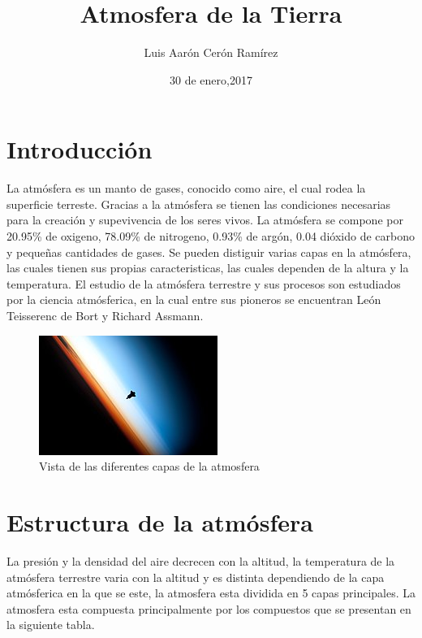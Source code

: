 \documentclass{article}
\title{Atmosfera de la Tierra}
\author{Luis Aarón Cerón Ramírez}
\date{30 de enero,2017}
\begin{document}
\maketitle
\section{Introducción}
La atmósfera es un manto de gases, conocido como aire, el cual rodea la superficie terreste. Gracias a la atmósfera se tienen las condiciones necesarias para la creación y supevivencia de los seres vivos.
\newline
La atmósfera se compone por 20.95\% de oxigeno, 78.09\% de nitrogeno, 0.93\% de argón, 0.04 dióxido de carbono y pequeñas cantidades de gases.
\newline
Se pueden distiguir varias capas en la atmósfera, las cuales tienen sus propias caracteristicas, las cuales dependen de la altura y la temperatura.
\newline
El estudio de la atmósfera terrestre y sus procesos son estudiados por la ciencia atmósferica, en la cual entre sus pioneros se encuentran León Teisserenc de Bort y Richard Assmann.

\begin{figure}
  \centering
  \includegraphics[scale=0.7]{at.jpg}
  \caption{Vista de las diferentes capas de la atmosfera }
  \label{fig:capas atmosferica}
\end{figure}

\section{Estructura de la atmósfera}
La presión y la densidad del aire decrecen con la altitud, la temperatura de la atmósfera terrestre varia con la altitud y es distinta dependiendo de la capa atmósferica en la que se este, la atmosfera esta dividida en 5 capas principales.
\newline
La atmosfera esta compuesta principalmente por los compuestos que se presentan en la siguiente tabla.
\end{document}
